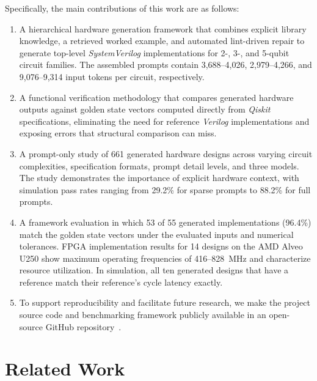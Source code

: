 \documentclass[conference]{IEEEtran}
\begin{document}
Specifically, the main contributions of this work are as follows:
\begin{enumerate}
\item A hierarchical hardware generation framework that combines explicit library knowledge, a retrieved worked example, and automated lint-driven repair to generate top-level \textit{SystemVerilog} implementations for 2-, 3-, and 5-qubit circuit families. The assembled prompts contain 3,688--4,026, 2,979--4,266, and 9,076--9,314 input tokens per circuit, respectively.

\item A functional verification methodology that compares generated hardware outputs against golden state vectors computed directly from \textit{Qiskit} specifications, eliminating the need for reference \textit{Verilog} implementations and exposing errors that structural comparison can miss.

\item A prompt-only study of 661 generated hardware designs across varying circuit complexities, specification formats, prompt detail levels, and three models. The study demonstrates the importance of explicit hardware context, with simulation pass rates ranging from 29.2\% for sparse prompts to 88.2\% for full prompts.

\item A framework evaluation in which 53 of 55 generated implementations (96.4\%) match the golden state vectors under the evaluated inputs and numerical tolerances. FPGA implementation results for 14 designs on the AMD Alveo U250 show maximum operating frequencies of 416--828~MHz and characterize resource utilization. In simulation, all ten generated designs that have a reference match their reference's cycle latency exactly.

\item To support reproducibility and facilitate future research,  we make the project source code and benchmarking framework publicly available in an open-source GitHub repository~\cite{llm_hardware_github}.
\end{enumerate}


\section{Related Work}
\label{sec:related}
\end{document}

